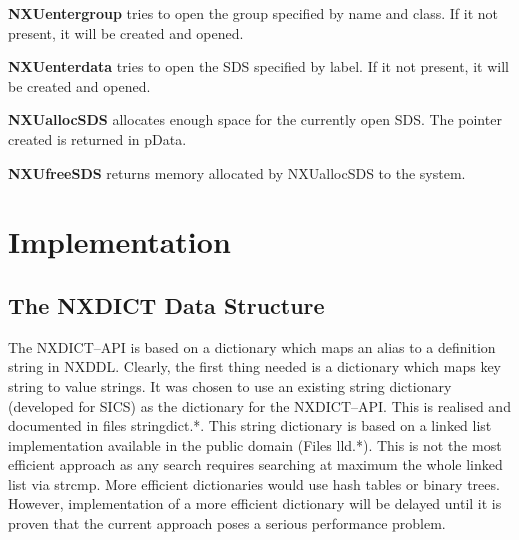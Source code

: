\documentclass[12pt]{article}
\begin{document}
 {\bf NXUentergroup} tries to open the group specified by name and class.
 If it not present, it will be created and opened.

 {\bf NXUenterdata} tries to open the SDS specified by label.
 If it not present, it will be created and opened.

  {\bf NXUallocSDS} allocates enough space for the currently open SDS. The
  pointer created is returned in pData. 

  {\bf NXUfreeSDS} returns memory allocated by NXUallocSDS to the system.


\section{Implementation}
\subsection{The NXDICT Data Structure}
The NXDICT--API is based on a dictionary which maps an alias to a definition
string in NXDDL. Clearly, the first thing needed is a dictionary which maps
key string to value strings. It was chosen to use an existing string
dictionary (developed for SICS) as the dictionary for the NXDICT--API. This
is realised and documented in files stringdict.*. This string dictionary is
based on a linked list implementation available in the public domain (Files
lld.*). This is not the most efficient approach as any search requires
searching at maximum the whole linked list via strcmp. More efficient
dictionaries would use hash tables or binary trees. However, implementation
of a more efficient dictionary will be    delayed until it is proven that
the current approach poses a serious performance problem.  
\end{document}

